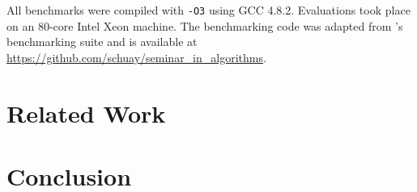 \documentclass[a4paper,10pt]{article}
\begin{document}
All benchmarks were compiled with \verb|-O3| using GCC 4.8.2. Evaluations took place
on an 80-core Intel Xeon machine. The benchmarking code was adapted from \citeauthor{linden2013skiplist}'s
benchmarking suite and is available at \url{https://github.com/schuay/seminar_in_algorithms}.


\begin{comment}
Sections / rough structure:
* Basic concepts and definitions. Linearizability, sequ./quiescent consistency,
  lock-free, wait-free, disjoint-access parallelism (one of the papers has good
  summaries of these).
  Maybe atomic primitives such as CAS (but probably not).
* Priority queue definitions, semantics, usages. Mention inherent
  non-scalability through DeleteMin().
* Skiplist, heap definitions, semantics, usages.
* Follow development of current state of the art from Hunt Heap ~> Shavit ~>
  Tsigas ~> Linden.
* Maybe benchmarks on mars.

Additional notes:
* Sketch development: Heap, Fraser Skiplist (Details, mention why linearizable),
  Sundell/Tsigas, other Skiplist-based PQs
* Modern developments: SprayList, Wimmer et al. Relation to other relaxed structures such as k-FIFO.
\end{comment}

\section{Related Work}


\begin{comment}
  * hunt: most efficient old-school algorithm
  * lots of other older references in [4]
  * israeli, rappoport: wait-free, non-available atomic primitive
  * lotan, shavit [4]: skiplist, lock-based. first to propose usage of skip-lists [11]
  * sundell, tsigas [3]: skiplist, lock-free, linearizable, unique priorities
  * herlihy, shavit in art of multiprocessor programming: based on [4], lock-free.
  * linden, jonsson [11]: skiplist, lock-free, linearizable, reduced mem contention.
    first lock-free PQ algorithm [11, 12]
  * specialized versions such as
    * bounded priorities: [7] and others
    * probabilistic extractMin, extractMany: [9]
\end{comment}

\section{Conclusion}

\begin{comment}
http://leo.stcloudstate.edu/acadwrite/conclude.html
http://writingcenter.unc.edu/handouts/conclusions/
http://www.wikihow.com/Write-a-Conclusion-for-a-Research-Paper
\end{comment}

\printbibliography
\end{document}
